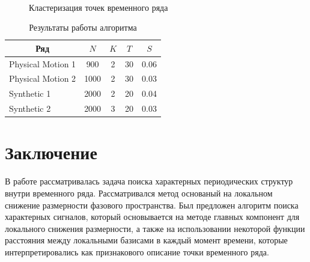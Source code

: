 \documentclass[12pt, twoside]{article}
\begin{document}
\begin{figure}[h!t]\center
{}
\\
\caption{Кластеризация точек временного ряда}
\label{fig_real_claster}
\end{figure}

\begin{table}[h]
\begin{center}
\caption{Результаты работы алгоритма}
\label{table_2}
\begin{tabular}{|c|c|c|c|c|}
\hline
	Ряд & $N$& $K$& $T$& $S$\\
	\hline
	\multicolumn{1}{|l|}{Physical Motion 1}
	& 900& 2& 30& 0.06\\
	\hline
	\multicolumn{1}{|l|}{Physical Motion 2}
	& 1000& 2& 30& 0.03\\
	\hline
	\multicolumn{1}{|l|}{Synthetic 1}
	& 2000& 2& 20& 0.04\\
	\hline
	\multicolumn{1}{|l|}{Synthetic 2}
	& 2000& 3& 20& 0.03\\
\hline

\end{tabular}
\end{center}
\end{table}

\section{Заключение}
В работе рассматривалась задача поиска характерных периодических структур внутри временного ряда. Рассматривался метод основаный на локальном снижение размерности фазового пространства. Был предложен алгоритм поиска характерных сигналов, который основывается на методе главных компонент для локального снижения размерности, а также на использовании некоторой функции расстояния между локальными базисами в каждый момент времени, которые интерпретировались как признакового описание точки временного ряда.
\end{document}
